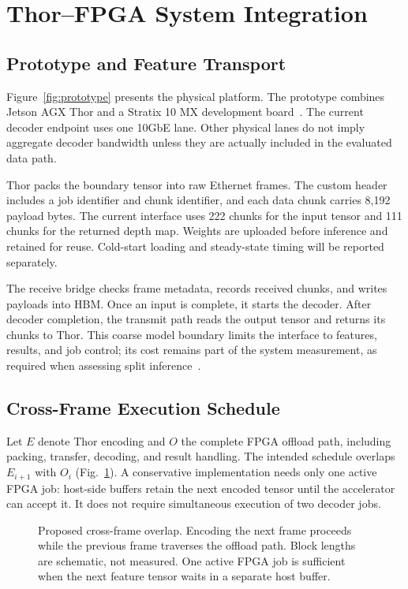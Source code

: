 \section{Thor--FPGA System Integration}
\label{sec:system}

\subsection{Prototype and Feature Transport}
Figure~\ref{fig:prototype} presents the physical platform. The prototype
combines Jetson AGX Thor and a Stratix 10 MX development
board~\cite{nvidiathorspec,intels10mxboard,intels10mxproduct}. The current
decoder endpoint uses one 10GbE lane. Other physical lanes do not imply
aggregate decoder bandwidth unless they are actually included in the
evaluated data path.

Thor packs the boundary tensor into raw Ethernet frames. The custom header
includes a job identifier and chunk identifier, and each data chunk carries
8,192 payload bytes. The current interface uses 222 chunks for the input
tensor and 111 chunks for the returned depth map. Weights are uploaded before
inference and retained for reuse. Cold-start loading and steady-state timing
will be reported separately.

The receive bridge checks frame metadata, records received chunks, and writes
payloads into HBM. Once an input is complete, it starts the decoder. After
decoder completion, the transmit path reads the output tensor and returns its
chunks to Thor. This coarse model boundary limits the interface to features,
results, and job control; its cost remains part of the system measurement,
as required when assessing split inference~\cite{matsubara2019split}.

\subsection{Cross-Frame Execution Schedule}
\label{sec:overlap}
Let $E$ denote Thor encoding and $O$ the complete FPGA offload path, including
packing, transfer, decoding, and result handling. The intended schedule
overlaps $E_{i+1}$ with $O_i$ (Fig.~\ref{fig:timeline}). A conservative
implementation needs only one active FPGA job: host-side buffers retain the
next encoded tensor until the accelerator can accept it. It does not require
simultaneous execution of two decoder jobs.

\begin{figure}[h]
  \centering
  
  \caption{Proposed cross-frame overlap. Encoding the next frame proceeds
  while the previous frame traverses the offload path. Block lengths are
  schematic, not measured. One active FPGA job is sufficient when the next
  feature tensor waits in a separate host buffer.}
  \label{fig:timeline}
\end{figure}

